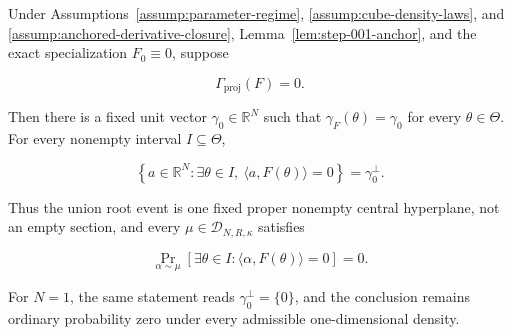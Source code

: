 \begin{proposition}
\label{prop:step-008-s2-stationary-projective}

Under Assumptions~\ref{assump:parameter-regime}, \ref{assump:cube-density-laws}, and
\ref{assump:anchored-derivative-closure}, Lemma~\ref{lem:step-001-anchor}, and the exact
specialization \(F_0\equiv0\), suppose

\begin{equation}
\label{eq:appendix-display-226}
\Gamma_{\mathrm{proj}}(F)=0.
\end{equation}

Then there is a fixed unit vector \(\gamma_0\in\mathbb R^N\) such that
\(\gamma_F(\theta)=\gamma_0\) for every \(\theta\in\Theta\). For every nonempty interval
\(I\subseteq\Theta\),

\begin{equation}
\label{eq:appendix-display-227}
\left\{a\in\mathbb R^N:
\exists\theta\in I,\ \langle a,F(\theta)\rangle=0\right\}
=\gamma_0^\perp.
\end{equation}

Thus the union root event is one fixed proper nonempty central hyperplane, not an empty section, and every
\(\mu\in\mathcal D_{N,R,\kappa}\) satisfies

\begin{equation}
\label{eq:appendix-display-228}
\Pr_{\alpha\sim\mu}
[\exists\theta\in I:\langle\alpha,F(\theta)\rangle=0]=0.
\end{equation}

For \(N=1\), the same statement reads \(\gamma_0^\perp=\{0\}\), and the conclusion remains ordinary
probability zero under every admissible one-dimensional density.


\end{proposition}

